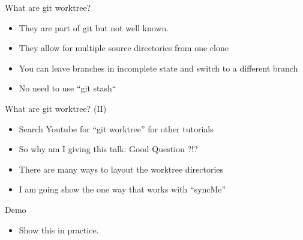 \documentclass{beamer}
\begin{document}
\begin{frame}{What are git worktree?}
  \begin{itemize}
    \item They are part of git but not well known.
    \item They allow for multiple source directories from one clone
    \item You can leave branches in incomplete state and switch to a
      different branch 
    \item No need to use ``git stash``
  \end{itemize}
\end{frame}

\begin{frame}{What are git worktree? (II)}
  \begin{itemize}
    \item Search Youtube for ``git worktree'' for other tutorials
    \item So why am I giving this talk: Good Question ?!?
    \item There are many ways to layout the worktree directories
    \item I am going show the one way that works with ``syncMe''
  \end{itemize}
\end{frame}

\begin{frame}{Demo}
  \begin{itemize}
    \item Show this in practice.
  \end{itemize}
\end{frame}
\end{document}
